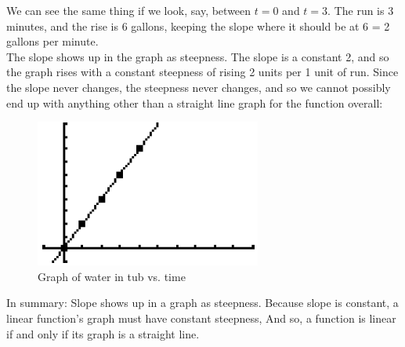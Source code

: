 We can see the same thing if we look, say, between $t=0$ and $t=3$. The run is 3 minutes, and the rise is 6 gallons, keeping the slope where it should be at 6 = 2 gallons per minute.\\

The slope shows up in the graph as steepness. The slope is a constant 2, and so the graph rises with a constant steepness of rising 2 units per 1 unit of run. Since the slope never changes, the steepness never changes, and so we cannot possibly end up with anything other than a straight line graph for the function overall:

\begin{figure}[H]
	\centering
	\includegraphics[scale=1.0]{Sections/LinearFunctionsandSlopeImages/Figure03.png}
	\caption{Graph of water in tub vs. time}
\end{figure}

In summary: Slope shows up in a graph as steepness. Because slope is constant, a linear function’s graph must have constant steepness, And so, a function is linear if and only if its graph is a straight line.


